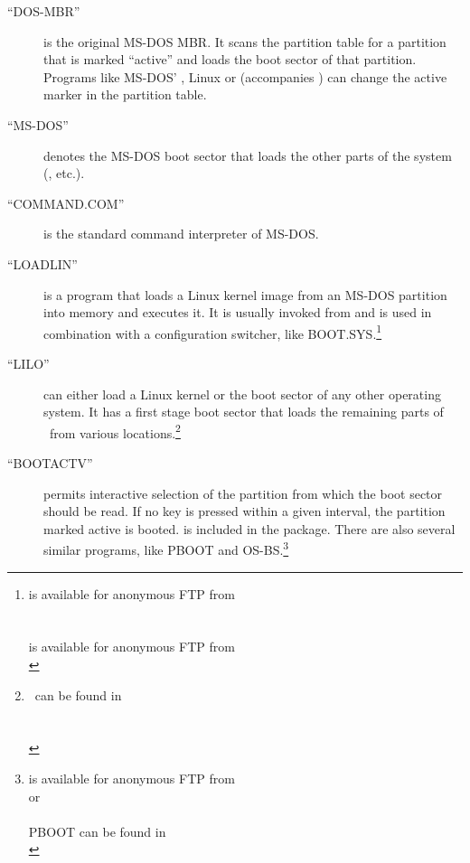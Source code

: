 \begin{description}
  \item[``DOS-MBR''] is the original MS-DOS MBR. It scans the partition
    table for a partition that is marked ``active'' and loads the boot
    sector of that partition. Programs like MS-DOS' , Linux
     or  (accompanies \LILO)
    can change the active marker in the partition table.
  \item[``MS-DOS''] denotes the MS-DOS boot sector that loads the other parts
    of the system (, etc.).
  \item[``COMMAND.COM''] is the standard command interpreter of MS-DOS.
  \item[``LOADLIN''] is a program that loads a Linux
    kernel image from an
    MS-DOS partition into memory and executes it. It is usually invoked
    from  and is used in combination with a 
    configuration switcher, like BOOT.SYS.\footnote{
       is available for anonymous FTP from \\
       \\
       \\
       is available for anonymous FTP from \\
      }
  \item[``LILO''] can either load a Linux kernel or the boot sector of any
    other operating system. It has a first stage boot sector that
    loads the remaining parts of \LILO\ from various locations.\footnote{%
      \LILO\ can be found in \\
	\\
       \\
      }
  \item[``BOOTACTV''] permits interactive selection of the partition from
    which the boot sector should be read. If no key is pressed within a
    given interval, the partition marked active is booted.  is
    included in the  package. There are also several similar
    programs, like PBOOT and OS-BS.\footnote{ is available for
      anonymous FTP from \\
	or \\
       \\
      PBOOT can be found in \\
      }
\end{description}



